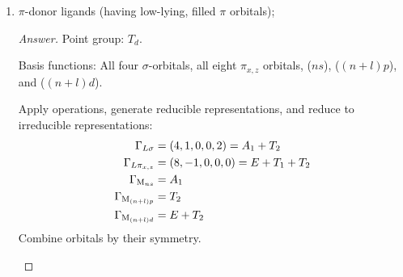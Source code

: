 \documentclass[../psets.tex]{subfiles}
\begin{document}
\begin{enumerate}[label={\Roman*)}]
\begin{enumerate}
\begin{proof}[Answer]
\begin{center}
            \end{center}
        \end{proof}
        \pagebreak
        \item $\pi$-donor ligands (having low-lying, filled $\pi$ orbitals);
        \begin{proof}[Answer]
            Point group: $T_d$.\par
            Basis functions: All four  $\sigma$-orbitals, all eight  $\pi_{x,z}$ orbitals, ($ns$), ($(n+l)p$), and ($(n+l)d$).\par
            Apply operations, generate reducible representations, and reduce to irreducible representations:
            \begin{align*}
                \Gamma_{L\sigma} &= (4,1,0,0,2) = A_1+T_2\\
                \Gamma_{L\pi_{x,z}} &= (8,-1,0,0,0) = E+T_1+T_2\\
                \Gamma_{\ce{M}_{ns}} &= A_1\\
                \Gamma_{\ce{M}_{(n+l)p}} &= T_2\\
                \Gamma_{\ce{M}_{(n+l)d}} &= E+T_2
            \end{align*}
            Combine orbitals by their symmetry.
            \begin{center}
\end{center}
\end{proof}
\end{enumerate}
\end{enumerate}
\end{document}
